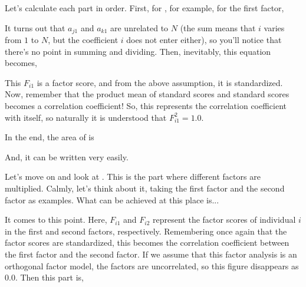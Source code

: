 \documentclass{ltjsbook}
\begin{document}
Let's calculate each part in order. First, for , for example, for the first factor,

It turns out that $a_{j1}$ and $a_{k1}$ are unrelated to $N$ (the sum means that $i$ varies from $1$ to $N$, but the coefficient $i$ does not enter either), so you'll notice that there's no point in summing and dividing. Then, inevitably, this equation becomes,

This $F_{i1}$ is a factor score, and from the above assumption, it is standardized. Now, remember that the product mean of standard scores and standard scores becomes a correlation coefficient! So, this represents the correlation coefficient with itself, so naturally it is understood that $F_{i1}^2 = 1.0$.

In the end, the area of  is

And, it can be written very easily.

Let's move on and look at . This is the part where different factors are multiplied. Calmly, let's think about it, taking the first factor and the second factor as examples. What can be achieved at this place is...

It comes to this point. Here, $F_{i1}$ and $F_{i2}$ represent the factor scores of individual $i$ in the first and second factors, respectively. Remembering once again that the factor scores are standardized, this becomes the correlation coefficient between the first factor and the second factor. If we assume that this factor analysis is an orthogonal factor model, the factors are uncorrelated, so this figure disappears as $0.0$. Then this part is,
\end{document}
